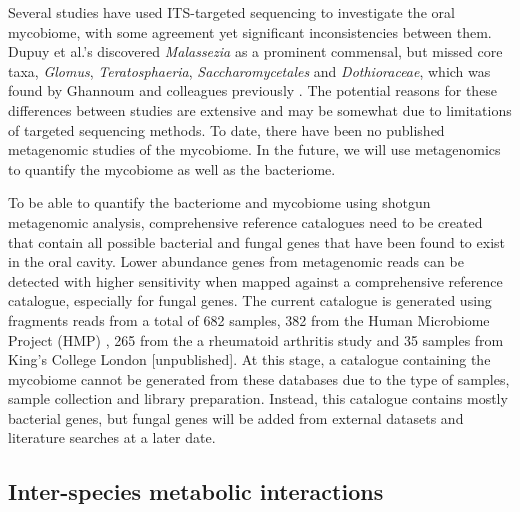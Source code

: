 \documentclass[a4paper]{article}
\begin{document}
Several studies have used ITS-targeted sequencing to investigate the oral mycobiome, with some agreement yet significant inconsistencies between them. Dupuy et al.'s discovered \textit{Malassezia} as a prominent commensal, but missed core taxa, \textit{Glomus}, \textit{Teratosphaeria}, \textit{Saccharomycetales} and \textit{Dothioraceae}, which was found by Ghannoum and colleagues previously \cite{ghannoum_characterization_2010, dupuy_redefining_2014}. The potential reasons for these differences between studies are extensive and may be somewhat due to limitations of targeted sequencing methods. To date, there have been no published metagenomic studies of the mycobiome. In the future, we will use metagenomics to quantify the mycobiome as well as the bacteriome.

To be able to quantify the bacteriome and mycobiome using shotgun metagenomic analysis, comprehensive reference catalogues need to be created that contain all possible bacterial and fungal genes that have been found to exist in the oral cavity. Lower abundance genes from metagenomic reads can be detected with higher sensitivity when mapped against a comprehensive reference catalogue, especially for fungal genes. The current catalogue is generated using fragments reads from a total of 682 samples, 382 from the Human Microbiome Project (HMP) \cite{human_microbiome_project_consortium_framework_2012}, 265 from the a rheumatoid arthritis study \cite{zhang_oral_2015} and 35 samples from King's College London [unpublished]. At this stage, a catalogue containing the mycobiome cannot be generated from these databases due to the type of samples, sample collection and library preparation. Instead, this catalogue contains mostly bacterial genes, but fungal genes will be added from external datasets and literature searches at a later date.

\subsection{Inter-species metabolic interactions}
\end{document}
